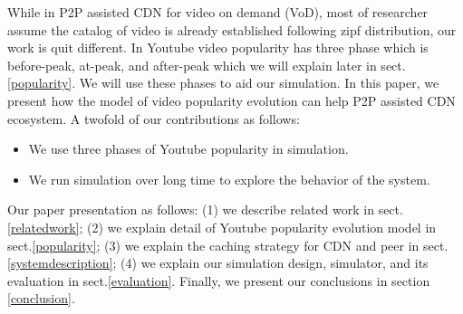 \documentclass[10pt,final,journal,a4paper]{IEEEtran}
\begin{document}
While in P2P assisted CDN for video on demand (VoD), most of researcher assume the catalog of video is already established following zipf distribution, our work is quit different.
In Youtube video popularity has three phase which is before-peak, at-peak, and after-peak \cite{Borghol:2011:CMP:2039452.2039717} which we will explain later in sect.\ref{popularity}.
We will use these phases to aid our simulation.
In this paper, we present how the model of video popularity evolution can help P2P assisted CDN ecosystem. 
A twofold of our contributions as follows:
\begin{itemize} 
\item We use three phases of Youtube popularity in simulation.
\item We run simulation over long time to explore the behavior of the system.
\end{itemize}

Our paper presentation as follows: (1) we describe related work in sect.\ref{relatedwork}; (2) we explain detail of Youtube popularity evolution model in sect.\ref{popularity}; (3) we explain the caching strategy for CDN and peer in sect.\ref{systemdescription}; (4) we explain our simulation design, simulator, and its evaluation in sect.\ref{evaluation}.
Finally, we present our conclusions in section \ref{conclusion}.

\end{document}
